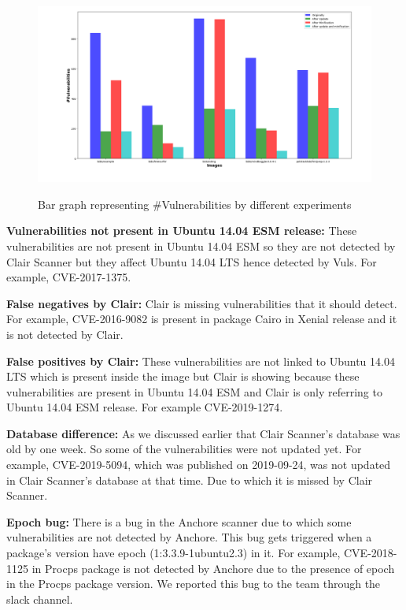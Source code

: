 \documentclass[a4paper,num-refs]{oup-contemporary}
\begin{document}
\begin{figure}[b]
        {\includegraphics[scale=1.5,width=\textwidth]
        {Figures/bargraph.png}}
        \caption{\label{fig:bargraph} Bar graph representing \#Vulnerabilities by different experiments}
      \end{figure}
\textbf{Vulnerabilities not present in Ubuntu 14.04 ESM release:} These vulnerabilities are not present in Ubuntu 14.04 ESM so they 
are not detected by Clair Scanner but they affect Ubuntu 14.04 LTS hence detected by Vuls. For example, CVE-2017-1375.

\textbf{False negatives by Clair:} Clair is missing vulnerabilities that it should detect. For example, CVE-2016-9082 
is present in package Cairo in Xenial release and it is not detected by Clair.

\textbf{False positives by Clair:} These vulnerabilities are not linked to Ubuntu 14.04 LTS which is 
present inside the image but Clair is showing because these vulnerabilities are present in Ubuntu 14.04 ESM and 
Clair is only referring to Ubuntu 14.04 ESM release. For example CVE-2019-1274.

\textbf{Database difference:} As we discussed earlier that Clair Scanner's database was old by one week.
                So some of the vulnerabilities were not updated yet. For example, CVE-2019-5094, which
		was published on 2019-09-24, was not 
		updated in Clair Scanner's database at that time. Due to which it is missed by Clair Scanner.


\textbf{Epoch bug:} There is a bug in the Anchore scanner due to which some vulnerabilities are 
		not detected by Anchore. This bug gets triggered when a package’s version have epoch 
		(1:3.3.9-1ubuntu2.3) in it. For example, CVE-2018-1125 in Procps package is not
		detected by Anchore due to the presence of epoch in the Procps package version.
		We reported this bug to the team through the slack channel.
\end{document}
